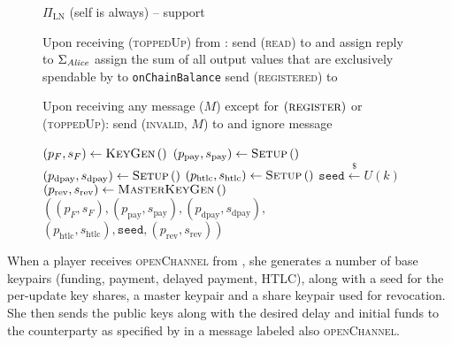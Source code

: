 \begin{figure}[H]
\begin{protocolbox}{$\Pi_{\mathrm{LN}}$ (self is \alice{} always) --
    support}
\begin{algorithmic}[1]
        \State Upon receiving (\textsc{toppedUp}) from \environment:
        \Indent
          \State send (\textsc{read}) to \ledger{} and assign reply to
          $\Sigma_{\mathit{Alice}}$
          \State assign the sum of all output values that are exclusively
          spendable by \alice{} to \texttt{onChainBalance}
          \State send (\textsc{registered}) to \environment
        \EndIndent
        \Statex

        \State Upon receiving any message ($M$) except for
        $\left(\textsc{register}\right)$ or (\textsc{toppedUp}):
        \Indent
            \State send (\textsc{invalid}, $M$) to \environment{} and ignore
            message
          \EndIf
        \EndIndent
        \Statex

          \State $\left(p_F, s_F\right) \gets \textsc{KeyGen}\left(\right)$
          \label{alg:protocol:support:gen:fund}
          \State $\left(p_{\mathrm{pay}}, s_{\mathrm{pay}}\right) \gets
          \textsc{Setup}\left(\right)$ 
          \State $\left(p_{\mathrm{dpay}}, s_{\mathrm{dpay}}\right) \gets
          \textsc{Setup}\left(\right)$ 
          \State $\left(p_{\mathrm{htlc}}, s_{\mathrm{htlc}}\right) \gets
          \textsc{Setup}\left(\right)$ 
          \State $\texttt{seed} \overset{\$}{\gets} U(k)$ 
          \State $\left(p_{\mathrm{rev}}, s_{\mathrm{rev}}\right) \gets
          \textsc{MasterKeyGen}\left(\right)$ 
          \label{alg:protocol:support:gen:rev}
          \State \Return $\left(\left(p_F, s_F\right), \left(p_{\mathrm{pay}},
          s_{\mathrm{pay}}\right), \left(p_{\mathrm{dpay}},
          s_{\mathrm{dpay}}\right),\right.$
          \Indent
            \State $\left.\left(p_{\mathrm{htlc}}, s_{\mathrm{htlc}}\right),
            \mathtt{seed}, \left(p_{\mathrm{rev}},
            s_{\mathrm{rev}}\right)\right)$
          \EndIndent
        \EndFunction
      \end{algorithmic}
    \end{protocolbox}
    \caption{}
    \label{alg:protocol:support}
  \end{figure}

  When a player receives \textsc{openChannel} from \environment, she generates a
  number of base keypairs (funding, payment, delayed payment, HTLC), along with
  a seed for the per-update key shares, a master keypair and a share keypair
  used for revocation. She then sends the public keys along with the desired
  delay and initial funds to the counterparty as specified by \environment{} in
  a message labeled also \textsc{openChannel}.

